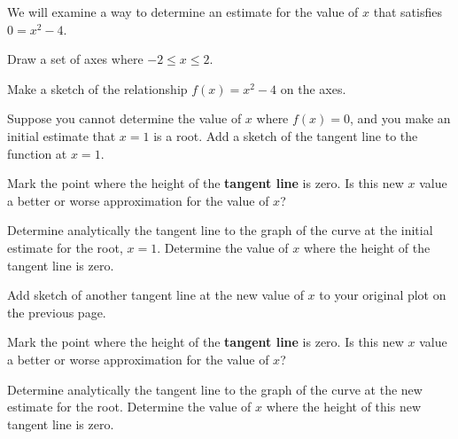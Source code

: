 \begin{problem}
\item We will examine a way to determine an estimate for the value of
  $x$ that satisfies $0=x^2-4$.
  \begin{subproblem}
  \item Draw a set of axes where $-2\leq x \leq 2$.


    \vfill

  \item Make a sketch of the relationship $f(x)=x^2-4$ on the axes.
  \item Suppose you cannot determine the value of $x$ where $f(x)=0$,
    and you make an initial estimate that $x=1$ is a root. Add a
    sketch of the tangent line to the function at $x=1$.

  \item Mark the point where the height of the \textbf{tangent line}
    is zero. Is this new $x$ value a better or worse approximation for the value of
    $x$?

    \vspace{2em}

    \clearpage


  \item Determine analytically the tangent line to the graph of the
    curve at the initial estimate for the root, $x=1$. Determine the
    value of $x$ where the height of the tangent line is zero.

    \vfill


  \item Add sketch of another tangent line at the new value of $x$ to
    your original plot on the previous page.

  \item Mark the point where the height of the \textbf{tangent line}
    is zero. Is this new $x$ value a better or worse approximation for the value of
    $x$?

    \vspace{2em}

  \item Determine analytically the tangent line to the graph of the
    curve at the new estimate for the root. Determine the value of $x$
    where the height of this new tangent line is zero.

    \vfill



\end{subproblem}
\end{problem}
